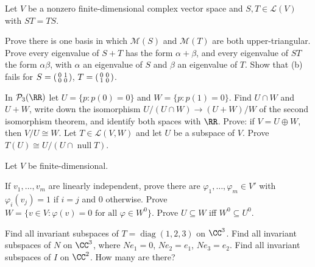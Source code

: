 \documentclass[10pt]{scrartcl}
\DeclareMathOperator{\nul}{null}
\newcommand{\LL}{\mathcal L}
\newcommand{\PP}{\mathcal P}
\newcommand{\MM}{\mathcal M}
\begin{document}
\begin{problem}
  Let $V$ be a nonzero finite-dimensional complex vector space and $S,T\in\LL(V)$ with $ST=TS$.
  \begin{enumerate}[(a)]
    \ii Prove there is one basis in which $\MM(S)$ and $\MM(T)$ are both upper-triangular.
    \ii Prove every eigenvalue of $S+T$ has the form $\alpha+\beta$, and every eigenvalue of $ST$ the form $\alpha\beta$, with $\alpha$ an eigenvalue of $S$ and $\beta$ an eigenvalue of $T$.
    \ii Show that (b) fails for $S=\begin{psmallmatrix}0&1\\0&0\end{psmallmatrix}$, $T=\begin{psmallmatrix}0&0\\1&0\end{psmallmatrix}$.
  \end{enumerate}
\end{problem}

\begin{problem}
  \leavevmode
  \begin{enumerate}[(a)]
    \ii In $\PP_3(\RR)$ let $U=\{p:p(0)=0\}$ and $W=\{p:p(1)=0\}$. Find $U\cap W$ and $U+W$, write down the isomorphism $U/(U\cap W)\to(U+W)/W$ of the second isomorphism theorem, and identify both spaces with $\RR$.
    \ii Prove: if $V=U\oplus W$, then $V/U\cong W$.
    \ii Let $T\in\LL(V,W)$ and let $U$ be a subspace of $V$. Prove $T(U)\cong U/(U\cap\nul T)$.
  \end{enumerate}
\end{problem}

\begin{problem}
  Let $V$ be finite-dimensional.
  \begin{enumerate}[(a)]
    \ii If $v_1,\dots,v_m$ are linearly independent, prove there are $\varphi_1,\dots,\varphi_m\in V'$ with $\varphi_i(v_j)=1$ if $i=j$ and $0$ otherwise.
    \ii Prove $W=\{v\in V:\varphi(v)=0\text{ for all }\varphi\in W^0\}$.
    \ii Prove $U\subseteq W$ iff $W^0\subseteq U^0$.
  \end{enumerate}
\end{problem}

\begin{problem}
  \leavevmode
  \begin{enumerate}[(a)]
    \ii Find all invariant subspaces of $T=\operatorname{diag}(1,2,3)$ on $\CC^3$.
    \ii Find all invariant subspaces of $N$ on $\CC^3$, where $Ne_1=0$, $Ne_2=e_1$, $Ne_3=e_2$.
    \ii Find all invariant subspaces of $I$ on $\CC^2$. How many are there?
  \end{enumerate}
\end{problem}
\end{document}
